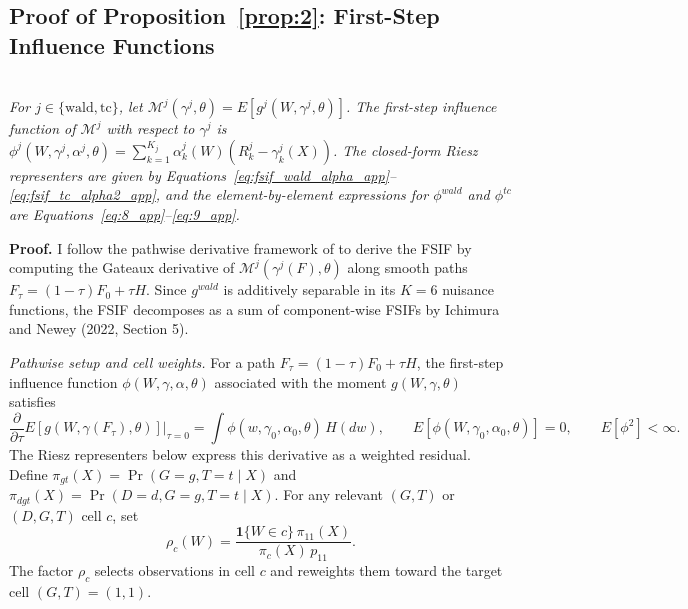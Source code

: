 \subsection{Proof of Proposition~\ref{prop:2}: First-Step Influence Functions}\label{sec:app_proof_prop2}\label{sec:app_fsif}
\begin{propproof}

\noindent \\
\textit{For $j\in\{\text{wald},\text{tc}\}$, let $\mathcal{M}^j(\gamma^j,\theta)=E[g^j(W,\gamma^j,\theta)]$. The first-step influence function of $\mathcal{M}^j$ with respect to $\gamma^j$ is $\phi^j(W,\gamma^j,\alpha^j,\theta)=\sum_{k=1}^{K_j}\alpha^j_k(W)(R^j_k-\gamma^j_k(X))$. The closed-form Riesz representers are given by Equations~\ref{eq:fsif_wald_alpha_app}--\ref{eq:fsif_tc_alpha2_app}, and the element-by-element expressions for $\phi^{wald}$ and $\phi^{tc}$ are Equations~\ref{eq:8_app}--\ref{eq:9_app}.}

\medskip
\noindent\textbf{Proof.} I follow the pathwise derivative framework of \cite{ichimura2022influence} to derive the FSIF by computing the Gateaux derivative of $\mathcal{M}^j(\gamma^j(F),\theta)$ along smooth paths $F_\tau = (1-\tau)F_0 + \tau H$. Since $g^{wald}$ is additively separable in its $K=6$ nuisance functions, the FSIF decomposes as a sum of component-wise FSIFs by Ichimura and Newey (2022, Section 5).

\medskip
\noindent\textit{Pathwise setup and cell weights.} For a path $F_\tau = (1-\tau)F_0 + \tau H$, the first-step influence function $\phi(W,\gamma,\alpha,\theta)$ associated with the moment $g(W,\gamma,\theta)$ satisfies
\begin{equation}\label{eq:fsif_def_app}
    \frac{\partial}{\partial \tau}E[g(W,\gamma(F_{\tau}),\theta)]\bigg|_{\tau=0}
    = \int \phi(w,\gamma_0,\alpha_0,\theta)\,H(dw),
    \qquad E[\phi(W,\gamma_0,\alpha_0,\theta)] = 0,
    \qquad E[\phi^2] < \infty.
\end{equation}
The Riesz representers below express this derivative as a weighted residual. Define $\pi_{gt}(X)=\Pr(G\!=\!g,T\!=\!t\mid X)$ and $\pi_{dgt}(X)=\Pr(D\!=\!d,G\!=\!g,T\!=\!t\mid X)$. For any relevant $(G,T)$ or $(D,G,T)$ cell $c$, set
\begin{equation}\label{eq:cellweight_app}
    \rho_c(W)=\frac{\mathbf{1}\{W\in c\}\,\pi_{11}(X)}{\pi_c(X)\,p_{11}}.
\end{equation}
The factor $\rho_c$ selects observations in cell $c$ and reweights them toward the target cell $(G,T)=(1,1)$.


\end{propproof}
